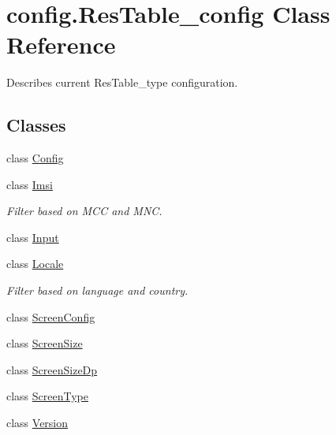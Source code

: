 \hypertarget{classconfig_1_1ResTable__config}{}\section{config.\+Res\+Table\+\_\+config Class Reference}
\label{classconfig_1_1ResTable__config}


Describes current Res\+Table\+\_\+type configuration.  


\subsection*{Classes}
\begin{DoxyCompactItemize}
\item 
class \mbox{\hyperlink{classconfig_1_1ResTable__config_1_1Config}{Config}}
\item 
class \mbox{\hyperlink{classconfig_1_1ResTable__config_1_1Imsi}{Imsi}}
\begin{DoxyCompactList}\small\item\em Filter based on M\+CC and M\+NC. \end{DoxyCompactList}\item 
class \mbox{\hyperlink{classconfig_1_1ResTable__config_1_1Input}{Input}}
\item 
class \mbox{\hyperlink{classconfig_1_1ResTable__config_1_1Locale}{Locale}}
\begin{DoxyCompactList}\small\item\em Filter based on language and country. \end{DoxyCompactList}\item 
class \mbox{\hyperlink{classconfig_1_1ResTable__config_1_1ScreenConfig}{Screen\+Config}}
\item 
class \mbox{\hyperlink{classconfig_1_1ResTable__config_1_1ScreenSize}{Screen\+Size}}
\item 
class \mbox{\hyperlink{classconfig_1_1ResTable__config_1_1ScreenSizeDp}{Screen\+Size\+Dp}}
\item 
class \mbox{\hyperlink{classconfig_1_1ResTable__config_1_1ScreenType}{Screen\+Type}}
\item 
class \mbox{\hyperlink{classconfig_1_1ResTable__config_1_1Version}{Version}}
\end{DoxyCompactItemize}
